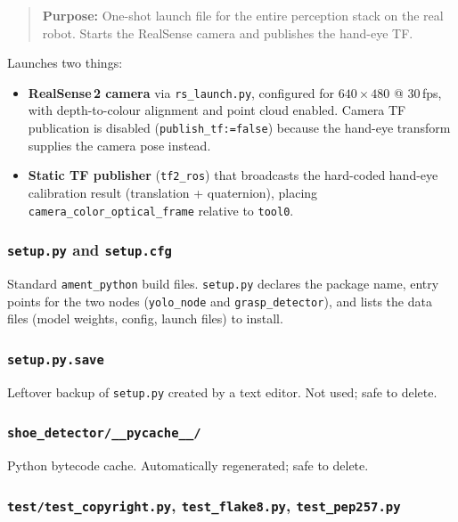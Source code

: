 \documentclass[11pt,a4paper]{article}
\newcommand{\file}[1]{\texttt{#1}}
\newenvironment{filebox}{%
  \par\vspace{0.3em}\begin{quote}\itshape
}{%
  \end{quote}\vspace{0.3em}%
}
\begin{document}
\begin{filebox}
\textbf{Purpose:} One-shot launch file for the entire perception stack on the
real robot. Starts the RealSense camera and publishes the hand-eye TF.
\end{filebox}

Launches two things:
\begin{itemize}
  \item \textbf{RealSense\,2 camera} via \file{rs\_launch.py}, configured for
        $640\times480$ @ 30\,fps, with depth-to-colour alignment and point cloud
        enabled. Camera TF publication is disabled (\texttt{publish\_tf:=false})
        because the hand-eye transform supplies the camera pose instead.
  \item \textbf{Static TF publisher} (\texttt{tf2\_ros}) that broadcasts the
        hard-coded hand-eye calibration result (translation + quaternion),
        placing \texttt{camera\_color\_optical\_frame} relative to \texttt{tool0}.
\end{itemize}

\subsubsection{\file{setup.py} and \file{setup.cfg}}

Standard \texttt{ament\_python} build files. \file{setup.py} declares the
package name, entry points for the two nodes (\texttt{yolo\_node} and
\texttt{grasp\_detector}), and lists the data files (model weights, config,
launch files) to install.

\subsubsection{\file{setup.py.save}}

Leftover backup of \file{setup.py} created by a text editor.
Not used; safe to delete.

\subsubsection{\file{shoe\_detector/\_\_pycache\_\_/}}

Python bytecode cache. Automatically regenerated; safe to delete.

\subsubsection{\file{test/test\_copyright.py}, \file{test\_flake8.py}, \file{test\_pep257.py}}
\end{document}
